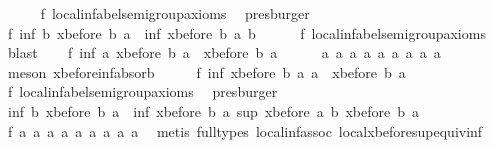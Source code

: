 \begin{isabellebody}
\ \ \ \ \isamarkupfalse%
\ f{}{}\ local{\isachardot}inf{\isachardot}abel{\isacharunderscore}semigroup{\isacharunderscore}axioms\ \isamarkupfalse%
\ presburger\isanewline
\ \ \isamarkupfalse%
\ f{}{}{\isacharcolon}\ {\isachardoublequoteopen}inf\ b\ {\isacharparenleft}xbefore\ b\ a{\isacharparenright}\ {\isacharequal}\ inf\ {\isacharparenleft}xbefore\ b\ a{\isacharparenright}\ b{\isachardoublequoteclose}\isanewline
\ \ \ \ \isamarkupfalse%
\ f{}{}\ local{\isachardot}inf{\isachardot}abel{\isacharunderscore}semigroup{\isacharunderscore}axioms\ \isamarkupfalse%
\ blast\isanewline
\ \ \isamarkupfalse%
\ f{}{}{\isacharcolon}\ {\isachardoublequoteopen}inf\ a\ {\isacharparenleft}xbefore\ b\ a{\isacharparenright}\ {\isacharequal}\ xbefore\ b\ a{\isachardoublequoteclose}\isanewline
\ \ \ \ \isamarkupfalse%
\ a{}\ a{}\ a{}\ a{}\ a{}\ a{}\ a{}\ a{}\ a{}\ \isamarkupfalse%
\ {\isacharparenleft}meson\ xbefore{\isacharunderscore}inf{\isacharunderscore}absorb{\isacharunderscore}{}{\isacharparenright}\isanewline
\ \ \isamarkupfalse%
\ \isamarkupfalse%
\ f{}{}{\isacharcolon}\ {\isachardoublequoteopen}inf\ {\isacharparenleft}xbefore\ b\ a{\isacharparenright}\ a\ {\isacharequal}\ xbefore\ b\ a{\isachardoublequoteclose}\isanewline
\ \ \ \ \isamarkupfalse%
\ f{}{}\ local{\isachardot}inf{\isachardot}abel{\isacharunderscore}semigroup{\isacharunderscore}axioms\ \isamarkupfalse%
\ presburger\isanewline
\ \ \isamarkupfalse%
\ \isamarkupfalse%
\ {\isachardoublequoteopen}inf\ b\ {\isacharparenleft}xbefore\ b\ a{\isacharparenright}\ {\isacharequal}\ inf\ {\isacharparenleft}xbefore\ b\ a{\isacharparenright}\ {\isacharparenleft}sup\ {\isacharparenleft}xbefore\ a\ b{\isacharparenright}\ {\isacharparenleft}xbefore\ b\ a{\isacharparenright}{\isacharparenright}{\isachardoublequoteclose}\isanewline
\ \ \ \ \isamarkupfalse%
\ f{}{}\ a{}\ a{}\ a{}\ a{}\ a{}\ a{}\ a{}\ a{}\ a{}\ \isamarkupfalse%
\ {\isacharparenleft}metis\ {\isacharparenleft}full{\isacharunderscore}types{\isacharparenright}\ local{\isachardot}inf{\isachardot}assoc\ local{\isachardot}xbefore{\isacharunderscore}sup{\isacharunderscore}equiv{\isacharunderscore}inf{\isacharparenright}\isanewline

\end{isabellebody}

